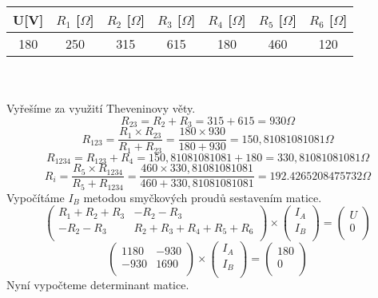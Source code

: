 \documentclass{article}
\begin{document}
\begin{tabular}{| c | c | c | c | c | c | c |}
  \hline
   U[V] & $R_{1}$ [$\Omega$] & $R_{2}$ [$\Omega$]& $R_{3}$ [$\Omega$]& $R_{4}$ [$\Omega$]& $R_{5}$ [$\Omega$]& $R_{6}$ [$\Omega$]\\
  \hline
  180 & 250 & 315 & 615 & 180 & 460 & 120\\
  \hline
\end{tabular}\\
\\
Vyřešíme za využití Theveninovy věty.\\
\[
  R_{23} = R_{2} + R_{3} = 315 + 615 = 930 \Omega
\]
\[
  R_{123} = \displaystyle\frac{R_{1} \times R_{23}}{R_{1} + R_{23}}=\displaystyle\frac{180 \times 930}{180 + 930} = 150,81081081081 \Omega 
\]
\[
  R_{1234} = R_{123} + R_{4} = 150,81081081081 + 180 = 330,81081081081 \Omega
\]
\[
  R_{i} = \displaystyle\frac{R_{5} \times R_{1234}}{R_{5} + R_{1234}} = \displaystyle\frac{460 \times 330,81081081081}{460 + 330,81081081081} = 192.4265208475732 \Omega
\]
Vypočítáme $I_{B}$ metodou smyčkových proudů sestavením matice.\\
\[
  \begin{pmatrix}
    R_{1}+R_{2}+R_{3} & -R_{2}-R_{3}\\
    -R_{2}-R_{3} & R_{2}+R_{3}+R_{4}+R_{5}+R_{6}\\
  \end{pmatrix}
  \times
  \begin{pmatrix}
    I_{A}\\
    I_{B}\\
  \end{pmatrix}
  =
  \begin{pmatrix}
    U\\
    0\\
  \end{pmatrix}
\]
\[
  \begin{pmatrix}
    1180 & -930\\
    -930 & 1690\\
  \end{pmatrix}
  \times
  \begin{pmatrix}
    I_{A}\\
    I_{B}\\
  \end{pmatrix}
  =
  \begin{pmatrix}
    180\\
    0\\
  \end{pmatrix}
\]
Nyní vypočteme determinant matice.
\end{document}
